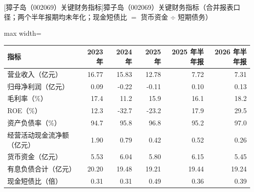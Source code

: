 \begin{center}\small\setlength{\tabcolsep}{3.4pt}
[獐子岛（002069）关键财务指标]{獐子岛（002069）关键财务指标（合并报表口径；两个半年报期均未年化；现金短债比 $=$ 货币资金 $\div$ 短期债务）}
\begin{adjustbox}{max width=\textwidth}
\begin{tabular}{@{}lrrrrr@{}}
\toprule
指标 & 2023 年 & 2024 年 & 2025 年 & 2025 年半年报 & 2026 年半年报 \\
\midrule
营业收入（亿元） & 16.77 & 15.83 & 12.78 & 7.72 & 7.31 \\
归母净利润（亿元） & 0.09 & -0.22 & -0.11 & 0.10 & 0.13 \\
毛利率（\%） & 17.4 & 11.2 & 15.9 & 16.1 & 18.2 \\
ROE（\%） & 12.3 & -32.7 & -23.2 & 17.9 & 29.5 \\
资产负债率（\%） & 94.7 & 95.8 & 96.8 & 95.2 & 97.0 \\
经营活动现金流净额（亿元） & 1.90 & 0.79 & 0.42 & 0.52 & 0.26 \\
货币资金（亿元） & 5.53 & 6.04 & 5.80 & 6.15 & 5.45 \\
有息负债合计（亿元） & 20.20 & 19.48 & 19.21 & 19.44 & 19.24 \\
现金短债比（倍） & 0.31 & 0.31 & 0.49 & 0.36 & 0.39 \\
\bottomrule
\end{tabular}
\end{adjustbox}
\end{center}

